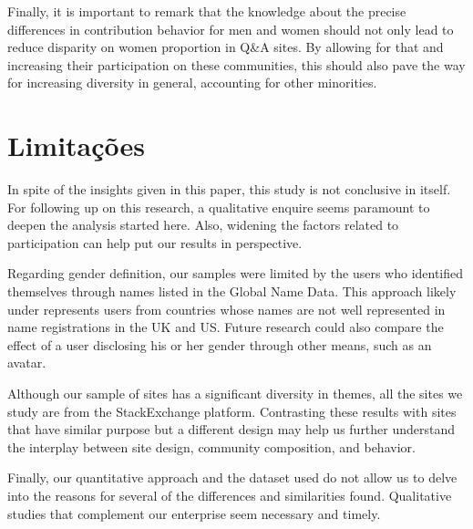 Finally, it is important to remark that the knowledge about the precise differences in contribution behavior for men and women should not only lead to reduce disparity on women proportion in Q\&A sites. By allowing for that and increasing their participation on these communities, this should also pave the way for increasing diversity in general, accounting for other minorities.


\chapter{Limitações}
In spite of the insights given in this paper, this study is not conclusive in itself. For following up on this research, a qualitative enquire seems paramount to deepen the analysis started here. Also, widening the factors related to participation can help put our results in perspective.

Regarding gender definition, our samples were limited by the users who identified themselves through names listed in the Global Name Data. This approach likely under represents users from countries whose names are not well represented in name registrations in the UK and US. Future research could also compare the effect of a user disclosing his or her gender through other means, such as an avatar. 

Although our sample of sites has a significant diversity in themes, all the sites we study are from the StackExchange platform. Contrasting these results with sites that have similar purpose but a different design may help us further understand the interplay between site design, community composition, and behavior. 

Finally, our quantitative approach and the dataset used do not allow us to delve into the reasons for several of the differences and similarities found. Qualitative studies that complement our enterprise seem necessary and timely. 
